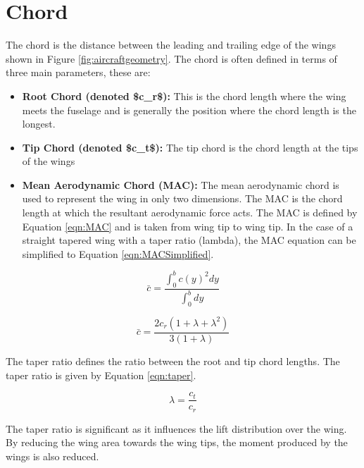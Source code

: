 \section{Chord}
The chord is the distance between the leading and trailing edge of the wings shown in Figure \ref{fig:aircraftgeometry}. The chord is often defined in terms of three main parameters, these are:

\begin{itemize}
    \item \textbf{Root Chord (denoted \acrshort{$c_r$}):} This is the chord length where the wing meets the fuselage and is generally the position where the chord length is the longest. 
    \item \textbf{Tip Chord (denoted \acrshort{$c_t$}):} The tip chord is the chord length at the tips of the wings 
    \item \textbf{Mean Aerodynamic Chord (\acrshort{MAC}):} The mean aerodynamic chord is used to represent the wing in only two dimensions. The \acrshort{MAC} is the chord length at which the resultant aerodynamic force acts. The \acrshort{MAC} is defined by Equation \ref{eqn:MAC} and is taken from wing tip to wing tip. In the case of a straight tapered wing with a taper ratio (\acrshort{lambda}), the \acrshort{MAC} equation can be simplified to Equation \ref{eqn:MACSimplified}.
    
\end{itemize} 

\begin{equation}
    \bar{c} =  \frac{ \int_{0}^{b} c(y)^2 dy}{\int_{0}^{b} dy}
    \label{eqn:MAC}
\end{equation}

\begin{equation}
    \bar{c} =  \frac{ 2c_r(1 + \lambda + \lambda^2)}{3(1 + \lambda)}
    \label{eqn:MACSimplified}
\end{equation}

 The taper ratio defines the ratio between the root and tip chord lengths. The taper ratio is given by Equation \ref{eqn:taper}.
 
 \begin{equation}
     \lambda = \frac{c_t}{c_r}
     \label{eqn:taper}
 \end{equation}
 
 The taper ratio is significant as it influences the lift distribution over the wing. By reducing the wing area towards the wing tips, the moment produced by the wings is also reduced. 
 
